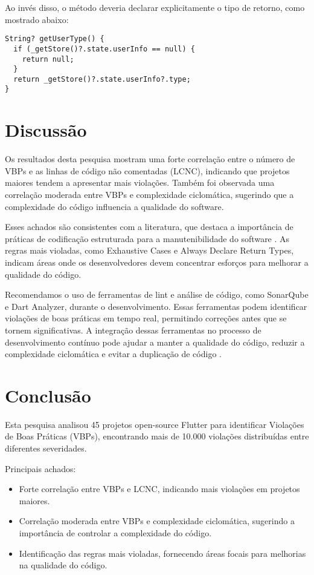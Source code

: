 \documentclass[12pt]{article}
\begin{document}
Ao invés disso, o método deveria declarar explicitamente o tipo de retorno, como mostrado abaixo:

\begin{tcolorbox}[codeSnippetStyle={}]
\begin{verbatim}
String? getUserType() {
  if (_getStore()?.state.userInfo == null) {
    return null;
  }
  return _getStore()?.state.userInfo?.type;
}
\end{verbatim}
\end{tcolorbox}

\section{Discussão}
Os resultados desta pesquisa mostram uma forte correlação entre o número de VBPs e as linhas de código não comentadas (LCNC), indicando que projetos maiores tendem a apresentar mais violações. Também foi observada uma correlação moderada entre VBPs e complexidade ciclomática, sugerindo que a complexidade do código influencia a qualidade do software.

Esses achados são consistentes com a literatura, que destaca a importância de práticas de codificação estruturada para a manutenibilidade do software \cite{hunt1999pragmatic}. As regras mais violadas, como Exhaustive Cases e Always Declare Return Types, indicam áreas onde os desenvolvedores devem concentrar esforços para melhorar a qualidade do código.

Recomendamos o uso de ferramentas de lint e análise de código, como SonarQube e Dart Analyzer, durante o desenvolvimento. Essas ferramentas podem identificar violações de boas práticas em tempo real, permitindo correções antes que se tornem significativas. A integração dessas ferramentas no processo de desenvolvimento contínuo pode ajudar a manter a qualidade do código, reduzir a complexidade ciclomática e evitar a duplicação de código \cite{martin2011clean}.

\section{Conclusão}
Esta pesquisa analisou 45 projetos open-source Flutter para identificar Violações de Boas Práticas (VBPs), encontrando mais de 10.000 violações distribuídas entre diferentes severidades.

Principais achados:
\begin{itemize}
\item Forte correlação entre VBPs e LCNC, indicando mais violações em projetos maiores.
\item Correlação moderada entre VBPs e complexidade ciclomática, sugerindo a importância de controlar a complexidade do código.
\item Identificação das regras mais violadas, fornecendo áreas focais para melhorias na qualidade do código.
\end{itemize}
\end{document}
